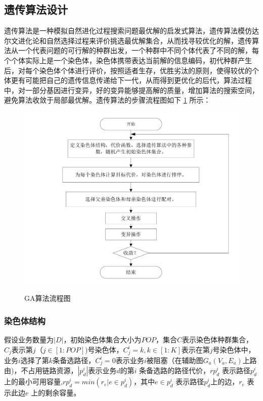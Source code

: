 \subsection{遗传算法设计}
遗传算法是一种模拟自然进化过程搜索问题最优解的启发式算法，遗传算法模仿达尔文进化论和自然选择过程来评价挑选最优解集合，从而找寻较优化的解，遗传算法从一个代表问题的可行解的种群出发，一个种群中不同个体代表了不同的解，每个个体实际上是一个染色体，染色体携带表达当前解的信息编码，初代种群产生后，对每个染色体个体进行评价，按照适者生存，优胜劣汰的原则，使得较优的个体更有可能把自己的遗传信息传递给下一代，从而得到更优化的后代，算法过程中，对一部分基因进行变异，好的变异能够提高解的质量，增加算法的搜索空间，避免算法收敛于局部最优解。遗传算法的步骤流程图如下 \ref{IterNum} 所示：
\begin{figure}
\setlength{\belowcaptionskip}{-0.5cm}
\begin{center}
{\includegraphics[width=0.8 \textwidth]{figures/GAprocess.pdf}}
\end{center}
\caption{{\footnotesize{GA算法流程图}}}
\label{IterNum}
\end{figure}
\subsubsection{染色体结构}

假设业务数量为$|D|$，初始染色体集合大小为$POP$，集合$C$表示染色体种群集合，$C_j$表示第$j$（$j \in [1:POP]$)号染色体，$C^i_j=k,k \in [1:K]$表示在第$j$号染色体中，业务$i$选择了第$k$条备选路径，$C^i_j=0$表示业务$i$被阻塞（在辅助图$G_a(V_a,E_a)$上路由)，不占用链路资源，$|p^i_d|$表示业务$d$的第$i$ 条备选路的路径代价，$rp^i_d$ 表示路径$p^i_d$ 上的最小可用容量,$rp^i_d=min(r_e|e \in p^i_d)$，其中$e \in p^i_d$ 表示路径$p^i_d$上的边，$r_e$ 表示此边$e$ 上的剩余容量。
